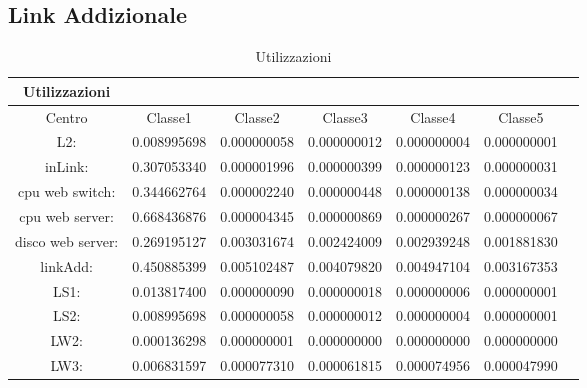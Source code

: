 \subsection{Link Addizionale}
\begin{table}[htbp]
\begin{center}
\begin{tabular}{||c|c|c|c|c|c|c||}
\hline
Utilizzazioni\\
\hline
Centro &Classe1 &Classe2 &Classe3 &Classe4 &Classe5\\
\hline
\hline
L2: &0.008995698 &0.000000058 &0.000000012 &0.000000004 &0.000000001\\
\hline
inLink: &0.307053340 &0.000001996 &0.000000399 &0.000000123 &0.000000031\\
\hline
cpu web switch: &0.344662764 &0.000002240 &0.000000448 &0.000000138 &0.000000034\\
\hline
cpu web server: &0.668436876 &0.000004345 &0.000000869 &0.000000267 &0.000000067\\
\hline
disco web server: &0.269195127 &0.003031674 &0.002424009 &0.002939248 &0.001881830\\
\hline
linkAdd: &0.450885399 &0.005102487 &0.004079820 &0.004947104 &0.003167353\\
\hline
LS1: &0.013817400 &0.000000090 &0.000000018 &0.000000006 &0.000000001\\
\hline
LS2: &0.008995698 &0.000000058 &0.000000012 &0.000000004 &0.000000001\\
\hline
LW2: &0.000136298 &0.000000001 &0.000000000 &0.000000000 &0.000000000\\
\hline
LW3: &0.006831597 &0.000077310 &0.000061815 &0.000074956 &0.000047990\\
\hline
\end{tabular}
\end{center}
\caption{Utilizzazioni}
\label{utilizzazioni}
\end{table}

